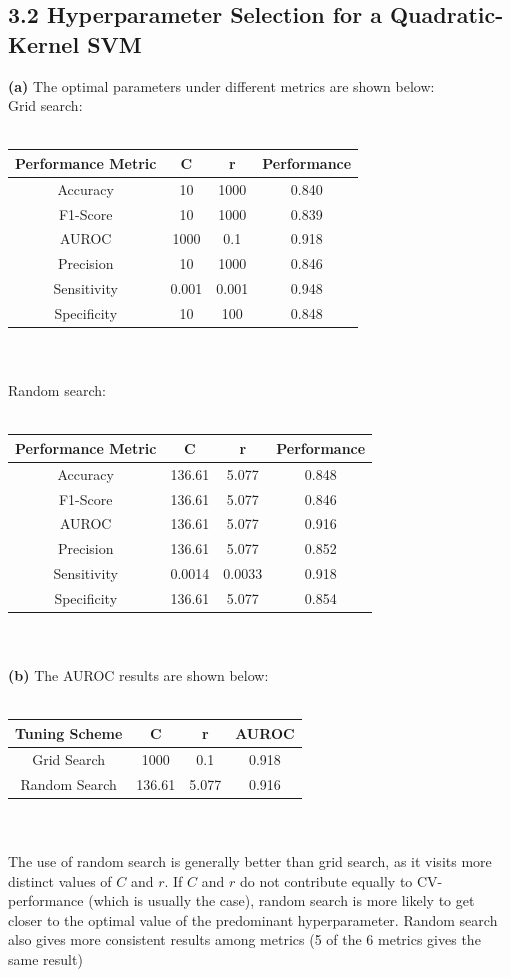\documentclass{article}
\begin{document}
\subsection*{3.2 Hyperparameter Selection for a Quadratic-Kernel SVM}
\textbf{(a)} The optimal parameters under different metrics are shown below:\\ Grid search: \\\\
\begin{tabular}{|c|c|c|c|}
\hline
\bf Performance Metric & \bf C & \bf r & \bf Performance \\ \hline
Accuracy & 10 & 1000 & 0.840 \\ \hline
F1-Score & 10 & 1000 & 0.839 \\ \hline
AUROC & 1000 & 0.1 & 0.918 \\ \hline
Precision & 10 & 1000 & 0.846 \\ \hline
Sensitivity & 0.001 & 0.001 & 0.948 \\ \hline
Specificity & 10 & 100 & 0.848 \\ \hline
\end{tabular}\\ \\
Random search: \\\\
\begin{tabular}{|c|c|c|c|}
\hline
\bf Performance Metric & \bf C & \bf r & \bf Performance \\ \hline
Accuracy & 136.61 & 5.077 & 0.848 \\ \hline
F1-Score & 136.61 & 5.077 & 0.846 \\ \hline
AUROC & 136.61 & 5.077 & 0.916 \\ \hline
Precision & 136.61 & 5.077 & 0.852 \\ \hline
Sensitivity & 0.0014 & 0.0033 & 0.918 \\ \hline
Specificity & 136.61 & 5.077 & 0.854 \\ \hline
\end{tabular}\\ \\
\textbf{(b)} The AUROC results are shown below:\\\\
\begin{tabular}{|c|c|c|c|}
\hline
\bf Tuning Scheme & \bf C & \bf r & \bf AUROC \\ \hline
Grid Search & 1000 & 0.1 & 0.918 \\ \hline
Random Search & 136.61 & 5.077 & 0.916\\ \hline
\end{tabular}\\\\
\indent The use of random search is generally better than grid search,
as it visits more distinct values of $C$ and $r$.
If $C$ and $r$ do not contribute equally to CV-performance
(which is usually the case), random search is more likely to get closer to
the optimal value of the predominant hyperparameter. Random search also gives more consistent results among metrics
(5 of the 6 metrics gives the same result)
\end{document}
